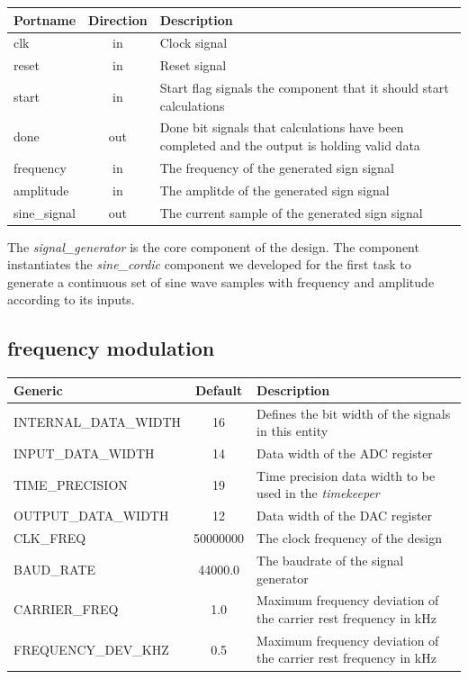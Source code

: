 \begin{center}
	\begin{tabular}{ | l | c | l | }
		\hline
		\textbf{Portname} & \textbf{Direction} & \textbf{Description} \\
		\hline
		clk & in & Clock signal \\
		reset & in  & Reset signal \\
		start & in  & Start flag signals the component that it should start calculations \\
		done & out  & Done bit signals that calculations have been completed and the output is holding valid data \\
		frequency & in  & The frequency of the generated sign signal \\
		amplitude & in  & The amplitde of the generated sign signal \\
		sine\_signal & out  & The current sample of the generated sign signal \\
		\hline
	\end{tabular} 
\end{center}

The \textit{signal\_generator} is the core component of the design. The component instantiates the \textit{sine\_cordic} component we developed for the first task to generate a continuous set of sine wave samples with frequency and amplitude according to its inputs. 


\subsection{frequency modulation}

\begin{center}
	\begin{tabular}{ | l | c | l | }
		\hline
		\textbf{Generic} & \textbf{Default} & \textbf{Description} \\ \hline
		INTERNAL\_DATA\_WIDTH & 16 & Defines the bit width of the signals in this entity \\
		INPUT\_DATA\_WIDTH & 14 & Data width of the ADC register \\
		TIME\_PRECISION & 19 & Time precision data width to be used in the \textit{timekeeper} \\
		OUTPUT\_DATA\_WIDTH & 12 & Data width of the DAC register \\
		CLK\_FREQ & 50000000 & The clock frequency of the design \\
		BAUD\_RATE & 44000.0 & The baudrate of the signal generator \\
		CARRIER\_FREQ & 1.0 & Maximum frequency deviation of the carrier rest frequency in kHz \\
		FREQUENCY\_DEV\_KHZ & 0.5 & Maximum frequency deviation of the carrier rest frequency in kHz \\
		\hline
	\end{tabular} 
\end{center}

